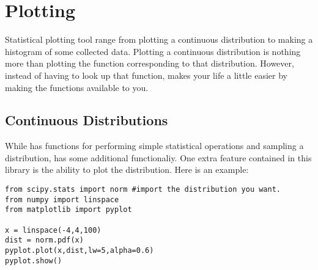 \section{Plotting}
Statistical plotting tool range from plotting a continuous
distribution to making a histogram of some collected data.  Plotting a
continuous distribution is nothing more than plotting the function
corresponding to that distribution.  However, instead of having to
look up that function,  makes your life a little easier by
making the functions available to you.

\subsection*{Continuous Distributions}
While  has functions for performing simple statistical
operations and sampling a distribution,  has some
additional functionaliy.  One extra feature contained in this library
is the ability to plot the distribution.  Here is an example:


\begin{Verbatim}
from scipy.stats import norm #import the distribution you want.
from numpy import linspace
from matplotlib import pyplot

x = linspace(-4,4,100)
dist = norm.pdf(x)
pyplot.plot(x,dist,lw=5,alpha=0.6)
pyplot.show()
\end{Verbatim}


